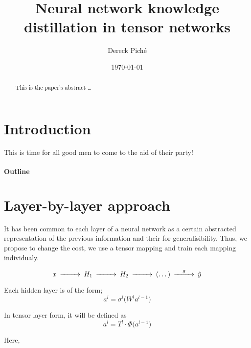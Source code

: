 \documentclass[11pt]{article}
\title{Neural network knowledge distillation in tensor networks}
\author{Dereck Piché}
\date{\today}
\begin{document}
\maketitle

\begin{abstract}
This is the paper's abstract \ldots
\end{abstract}

\section{Introduction}
This is time for all good men to come to the aid of their party!

\paragraph{Outline}


\section{Layer-by-layer approach}
It has been common to each layer of a neural network as a certain abstracted representation of the previous information and their for generalisibility. Thus, we propose to change the cost, we use a tensor mapping and train each mapping individualy.

\begin{equation*}
\begin{CD}
    x @>>>H_1 @>>>H_2 @>>>(\dots)@>g>> \hat{y}
\end{CD}
\end{equation*}

Each hidden layer is of the form;
\begin{equation*}
    a^l = \sigma^l \bigl( W^l a^{l-1} \bigr)
\end{equation*}

In tensor layer form, it will be defined as 
\begin{equation*}
    a^l = T^l \cdot \Phi \bigl( a^{l-1} \bigr)
\end{equation*}

Here, 






\end{document}
